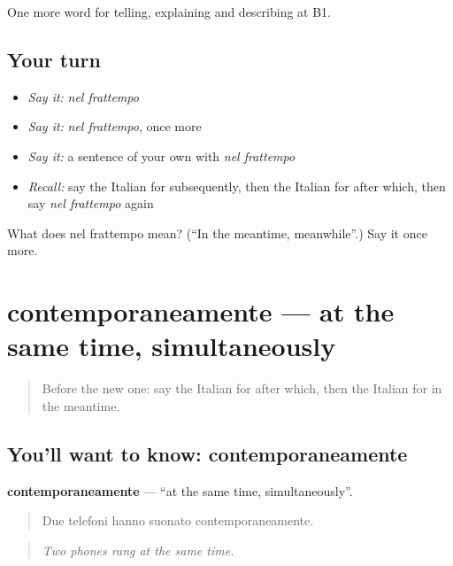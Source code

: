 \begin{grammarlens}[title={What you've built}]
One more word for telling, explaining and describing at B1.
\end{grammarlens}

\subsection*{Your turn}
\begin{itemize}
\raggedright
  \item \emph{Say it:} \emph{nel frattempo}
  \item \emph{Say it:} \emph{nel frattempo}, once more
  \item \emph{Say it:} a sentence of your own with \emph{nel frattempo}
  \item \emph{Recall:} say the Italian for subsequently, then the Italian for after which, then say \emph{nel frattempo} again
\end{itemize}

\begin{tcolorbox}[breakable,colback=teal!4,colframe=teal!35!black,title={Before you move on}]
What does nel frattempo mean? (\textquotedblleft{}In the meantime, meanwhile\textquotedblright{}.) Say it once more.
\end{tcolorbox}
\section[contemporaneamente]{contemporaneamente — at the same time, simultaneously}

\label{lesson:IT-C274-contemporaneamente}



\begin{quote}
Before the new one: say the Italian for after which, then the Italian for in the meantime.
\end{quote}

\subsection*{You'll want to know: contemporaneamente}
\textbf{contemporaneamente} — \textquotedblleft{}at the same time, simultaneously\textquotedblright{}.

\begin{quote}
Due telefoni hanno suonato contemporaneamente.
\end{quote}

\begin{quote}
\emph{Two phones rang at the same time.}
\end{quote}


